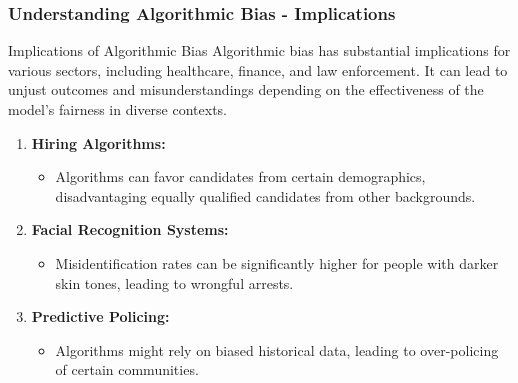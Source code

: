 \documentclass[aspectratio=169]{beamer}
\begin{document}
\begin{frame}[fragile]
    \frametitle{Understanding Algorithmic Bias - Implications}
    \begin{block}{Implications of Algorithmic Bias}
        Algorithmic bias has substantial implications for various sectors, including healthcare, finance, and law enforcement. It can lead to unjust outcomes and misunderstandings depending on the effectiveness of the model's fairness in diverse contexts.
    \end{block}

    \begin{enumerate}
        \item \textbf{Hiring Algorithms:}
        \begin{itemize}
            \item Algorithms can favor candidates from certain demographics, disadvantaging equally qualified candidates from other backgrounds.
        \end{itemize}
        
        \item \textbf{Facial Recognition Systems:}
        \begin{itemize}
            \item Misidentification rates can be significantly higher for people with darker skin tones, leading to wrongful arrests.
        \end{itemize}

        \item \textbf{Predictive Policing:}
        \begin{itemize}
            \item Algorithms might rely on biased historical data, leading to over-policing of certain communities.
        \end{itemize}
    \end{enumerate}
\end{frame}
\end{document}
